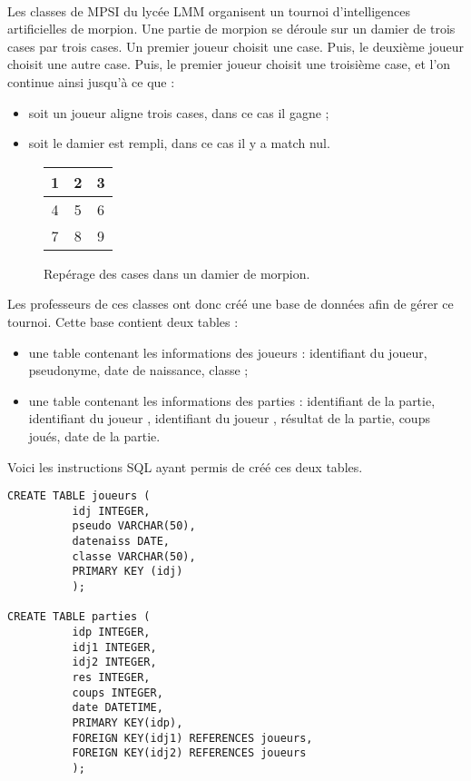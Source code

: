\exer{[SQL-000]}
\setcounter{numques}{0}~\\

Les classes de MPSI du lycée LMM organisent un tournoi d'intelligences artificielles de morpion. 
Une partie de morpion se déroule sur un damier de trois cases par trois cases. Un premier joueur choisit une case. 
Puis, le deuxième joueur choisit une autre case. 
Puis, le premier joueur choisit une troisième case, et l'on continue ainsi jusqu'à ce que :
\begin{itemize}
  \item soit un joueur aligne trois cases, dans ce cas il gagne ;
  \item soit le damier est rempli, dans ce cas il y a match nul. 
\end{itemize}
\begin{figure}[!h]
  \begin{center}
    \begin{tabular}{|c|c|c|}
      \hline
      1 & 2 & 3 \\
      \hline
      4 & 5 & 6 \\
      \hline
      7 & 8 & 9 \\
      \hline
    \end{tabular}
    \caption{Repérage des cases dans un damier de morpion.}
    \label{morpion:cases}
  \end{center}
\end{figure}
Les professeurs de ces classes ont donc créé une base de données afin de gérer ce tournoi. 
Cette base contient deux tables : 
\begin{itemize}
  \item une table contenant les informations des joueurs : identifiant du joueur, pseudonyme, date de naissance, classe ; 
  \item une table contenant les informations des parties : identifiant de la partie, identifiant du joueur , identifiant du joueur , résultat de la partie, coups joués, date de la partie. 
\end{itemize}
Voici les instructions SQL ayant permis de créé ces deux tables. 
\begin{lstlisting}
CREATE TABLE joueurs (
          idj INTEGER,
          pseudo VARCHAR(50),
          datenaiss DATE,
          classe VARCHAR(50),
          PRIMARY KEY (idj)
          );

CREATE TABLE parties (
          idp INTEGER,
          idj1 INTEGER, 
          idj2 INTEGER,
          res INTEGER,
          coups INTEGER,
          date DATETIME,
          PRIMARY KEY(idp),
          FOREIGN KEY(idj1) REFERENCES joueurs,
          FOREIGN KEY(idj2) REFERENCES joueurs
          );
\end{lstlisting}
